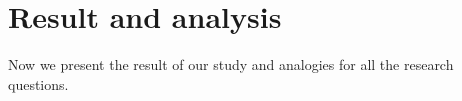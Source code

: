\section{Result and analysis}
\label{sec:Results}
Now we present the result of our study and analogies for all the research questions.







